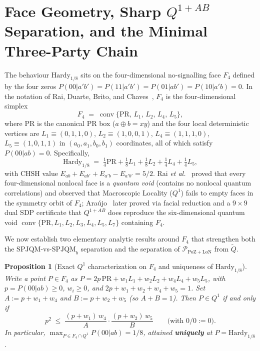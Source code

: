 \documentclass[11pt,a4paper]{article}
\newtheorem{proposition}[theorem]{Proposition}
\theoremstyle{definition}
\theoremstyle{remark}
\newcommand{\SPJQM}{\mathrm{SPJQM}}
\newcommand{\SPJQMb}{\mathrm{SPJQM}_b}
\newcommand{\Qone}{Q^{1}}
\newcommand{\QAB}{Q^{1+AB}}
\newcommand{\tQ}{\widetilde{Q}}
\newcommand{\PoZ}{\mathrm{PoZ}}
\newcommand{\LoN}{\mathrm{LoN}}
\newcommand{\PPoZ}{\mathcal{P}_{\PoZ+\LoN}}
\newcommand{\conv}{\operatorname{conv}}
\begin{document}
\section{Face Geometry, Sharp $\QAB$ Separation, and the Minimal Three-Party Chain}
\label{sec:face-qab}

The behaviour $\mathrm{Hardy}_{1/8}$ sits on the four-dimensional no-signalling face $F_4$ defined by the four zeros $P(00|a'b') = P(11|a'b') = P(01|ab') = P(10|a'b) = 0$. In the notation of Rai, Duarte, Brito, and Chaves~\cite{Rai2019}, $F_4$ is the four-dimensional simplex
\[
F_4 \;=\; \conv\{\mathrm{PR},\, L_1,\, L_2,\, L_4,\, L_5\},
\]
where $\mathrm{PR}$ is the canonical PR box ($a \oplus b = xy$) and the four local deterministic vertices are $L_1 \equiv (0,1,1,0)$, $L_2 \equiv (1,0,0,1)$, $L_4 \equiv (1,1,1,0)$, $L_5 \equiv (1,0,1,1)$ in $(a_0, a_1, b_0, b_1)$ coordinates, all of which satisfy $P(00|ab) = 0$. Specifically,
\[
\mathrm{Hardy}_{1/8} \;=\; \tfrac{1}{4}\mathrm{PR} + \tfrac{1}{8} L_1 + \tfrac{1}{8} L_2 + \tfrac{1}{4} L_4 + \tfrac{1}{4} L_5,
\]
with CHSH value $E_{ab}+E_{ab'}+E_{a'b}-E_{a'b'} = 5/2$. Rai \emph{et al.}~\cite{Rai2019} proved that every four-dimensional nonlocal face is a \emph{quantum void} (contains no nonlocal quantum correlations) and observed that Macroscopic Locality ($\Qone$) fails to empty faces in the symmetry orbit of $F_4$; Ara\'ujo~\cite{Araujo2023} later proved via facial reduction and a $9 \times 9$ dual SDP certificate that $\QAB$ does reproduce the six-dimensional quantum void $\conv\{\mathrm{PR}, L_1, L_2, L_3, L_4, L_5, L_7\}$ containing $F_4$.

We now establish two elementary analytic results around $F_4$ that strengthen both the $\SPJQM$-vs-$\SPJQMb$ separation and the separation of $\PPoZ$ from $\tQ$.

\begin{proposition}[Exact $\Qone$ characterization on $F_4$ and uniqueness of $\mathrm{Hardy}_{1/8}$]
\label{prop:face-max}
Write a point $P \in F_4$ as $P = 2p\,\mathrm{PR} + w_1 L_1 + w_2 L_2 + w_4 L_4 + w_5 L_5$, with $p = P(00|ab) \ge 0$, $w_i \ge 0$, and $2p + w_1 + w_2 + w_4 + w_5 = 1$. Set $A := p + w_1 + w_4$ and $B := p + w_2 + w_5$ (so $A + B = 1$). Then $P \in \Qone$ if and only if
\begin{equation}\label{eq:face-q1-iff}
p^2 \;\le\; \frac{(p+w_1)\,w_4}{A}\cdot\frac{(p+w_2)\,w_5}{B} \qquad \text{(with } 0/0 := 0\text{)}.
\end{equation}
In particular, $\max_{P \in F_4 \cap \Qone} P(00|ab) = 1/8$, attained \textbf{uniquely} at $P = \mathrm{Hardy}_{1/8}$.
\end{proposition}
\end{document}
